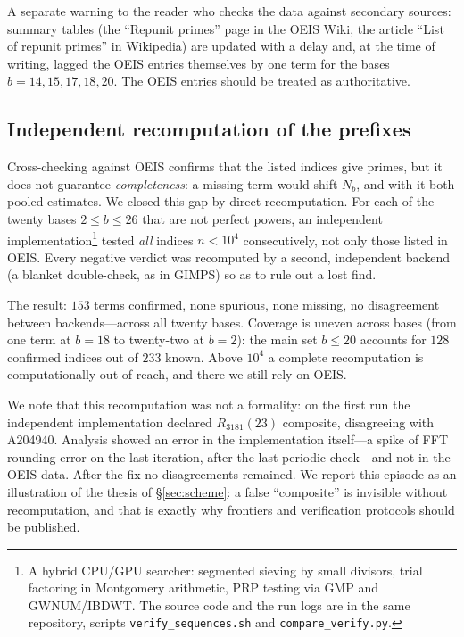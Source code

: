 \documentclass[11pt,a4paper]{article}
\theoremstyle{plain}
\theoremstyle{remark}
\begin{document}
A separate warning to the reader who checks the data against secondary sources:
summary tables (the ``Repunit primes'' page in the OEIS Wiki, the article ``List
of repunit primes'' in Wikipedia) are updated with a delay and, at the time of
writing, lagged the OEIS entries themselves by one term for the bases
$b=14,15,17,18,20$. The OEIS entries should be treated as authoritative.

\subsection*{Independent recomputation of the prefixes}

Cross-checking against OEIS confirms that the listed indices give primes, but it
does not guarantee \emph{completeness}: a missing term would shift $N_b$, and
with it both pooled estimates. We closed this gap by direct recomputation. For
each of the twenty bases $2\le b\le26$ that are not perfect powers, an
independent implementation\footnote{A hybrid CPU/GPU searcher: segmented sieving
by small divisors, trial factoring in Montgomery arithmetic, PRP testing via GMP
and GWNUM/IBDWT. The source code and the run logs are in the same repository,
scripts \texttt{verify\_sequences.sh} and \texttt{compare\_verify.py}.} tested
\emph{all} indices $n<10^4$ consecutively, not only those listed in OEIS. Every
negative verdict was recomputed by a second, independent backend (a blanket
double-check, as in GIMPS) so as to rule out a lost find.

The result: $153$ terms confirmed, none spurious, none missing, no disagreement
between backends---across all twenty bases. Coverage is uneven across bases
(from one term at $b=18$ to twenty-two at $b=2$): the main set $b\le20$ accounts
for $128$ confirmed indices out of $233$ known. Above $10^4$ a complete
recomputation is computationally out of reach, and there we still rely on OEIS.

We note that this recomputation was not a formality: on the first run the
independent implementation declared $R_{3181}(23)$ composite, disagreeing with
A204940. Analysis showed an error in the implementation itself---a spike of FFT
rounding error on the last iteration, after the last periodic check---and not in
the OEIS data. After the fix no disagreements remained. We report this episode as
an illustration of the thesis of \S\ref{sec:scheme}: a false ``composite'' is
invisible without recomputation, and that is exactly why frontiers and
verification protocols should be published.
\end{document}
